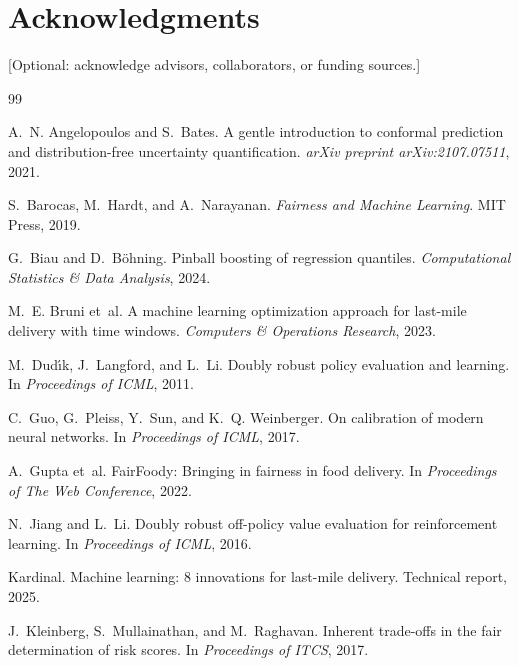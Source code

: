 \documentclass[10pt,twocolumn]{article}
\begin{document}
\section*{Acknowledgments}
[Optional: acknowledge advisors, collaborators, or funding sources.]


\begin{thebibliography}{99}

A.~N. Angelopoulos and S.~Bates.
\newblock A gentle introduction to conformal prediction and distribution-free uncertainty quantification.
\newblock \emph{arXiv preprint arXiv:2107.07511}, 2021.

S.~Barocas, M.~Hardt, and A.~Narayanan.
\newblock \emph{Fairness and Machine Learning}.
\newblock MIT Press, 2019.

G.~Biau and D.~B{\"o}hning.
\newblock Pinball boosting of regression quantiles.
\newblock \emph{Computational Statistics \& Data Analysis}, 2024.

M.~E. Bruni et~al.
\newblock A machine learning optimization approach for last-mile delivery with time windows.
\newblock \emph{Computers \& Operations Research}, 2023.

M.~Dud{\'\i}k, J.~Langford, and L.~Li.
\newblock Doubly robust policy evaluation and learning.
\newblock In \emph{Proceedings of ICML}, 2011.

C.~Guo, G.~Pleiss, Y.~Sun, and K.~Q. Weinberger.
\newblock On calibration of modern neural networks.
\newblock In \emph{Proceedings of ICML}, 2017.

A.~Gupta et~al.
\newblock FairFoody: Bringing in fairness in food delivery.
\newblock In \emph{Proceedings of The Web Conference}, 2022.

N.~Jiang and L.~Li.
\newblock Doubly robust off-policy value evaluation for reinforcement learning.
\newblock In \emph{Proceedings of ICML}, 2016.

Kardinal.
\newblock Machine learning: 8 innovations for last-mile delivery.
\newblock Technical report, 2025.

J.~Kleinberg, S.~Mullainathan, and M.~Raghavan.
\newblock Inherent trade-offs in the fair determination of risk scores.
\newblock In \emph{Proceedings of ITCS}, 2017.


\end{thebibliography}
\end{document}
